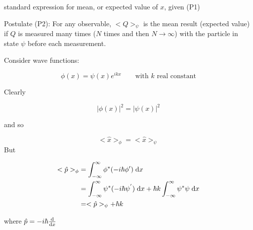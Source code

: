 \documentclass[a4paper]{article}
\begin{document}
standard expression for mean, or expected value of $ x $, given (P1)



Postulate (P2): For any observable, $ <Q>_{\psi} $ is the mean result (expected value) if $ Q $ is measured many times ($ N $ times and then $ N \to \infty $) with the particle in state $ \psi $ before each measurement.

Consider wave functions:

\[ \phi(x) = \psi(x) e^{ikx} \qquad \text{with } k \text{ real constant} \]

Clearly

\[ | \phi(x) |^{2} = | \psi(x) |^{2} \]

and so 

\[ <\hat{x}>_{\phi} = <\hat{x}>_{\psi} \]
But

\begin{align*}
	<\hat{p}>_{\phi} & = \int_{-\infty}^{\infty} \phi^{*} (-i \hbar \phi') \; \mathrm{d} x \\
	& = \int_{-\infty}^{\infty} \psi^{*} (-i \hbar \psi^{'}) \; \mathrm{d} x + \hbar k \int_{-\infty}^{\infty} \psi^{*} \psi \; \mathrm{d} x \\
	& = <\hat{p}>_{\psi} + \hbar k
\end{align*}

where $ \hat{p} = - i \hbar \frac{\mathrm{d} }{\mathrm{d} x} $
\end{document}
